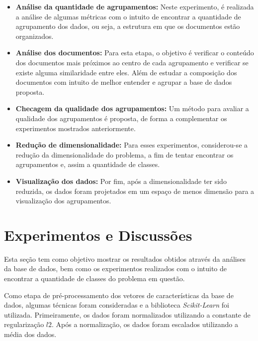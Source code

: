 \documentclass[conference]{IEEEtran}
\begin{document}
\begin{itemize}
	\item \small \textbf{Análise da quantidade de agrupamentos:} Neste experimento, é realizada a análise de algumas métricas com o intuito de encontrar a quantidade de agrupamento dos dados, ou seja, a estrutura em que os documentos estão organizados.
	
	\item \small \textbf{Análise dos documentos:} Para esta etapa, o objetivo é verificar o conteúdo dos documentos mais próximos ao centro de cada agrupamento e verificar se existe alguma similaridade entre eles. Além de estudar a composição dos documentos com intuito de melhor entender e agrupar a base de dados proposta.  
	
	\item \small \textbf{Checagem da qualidade dos agrupamentos:} Um método para avaliar a qualidade dos agrupamentos é proposta, de forma a complementar os experimentos mostrados anteriormente.
	
	\item \small \textbf{Redução de dimensionalidade:} Para esses experimentos, considerou-se a redução da dimensionalidade do problema, a fim de tentar encontrar os agrupamentos e, assim a quantidade de classes.
	
	\item \small \textbf{Visualização dos dados:} Por fim, após a dimensionalidade ter sido reduzida, os dados foram projetados em um espaço de menos dimensão para a visualização dos agrupamentos.
	
\end{itemize}

\section{Experimentos e Discussões} \label{sec:exp}

Esta seção tem como objetivo mostrar os resultados obtidos através da análises da base de dados, bem como os experimentos realizados com o intuito de encontrar a quantidade de classes do problema em questão. 

Como etapa de pré-processamento dos vetores de características da base de dados, algumas técnicas foram consideradas e a biblioteca \emph{Scikit-Learn} foi utilizada. Primeiramente, os dados foram normalizados utilizando a constante de regularização $l2$. Após a normalização, os dados foram escalados utilizando a média dos dados. 
\end{document}

